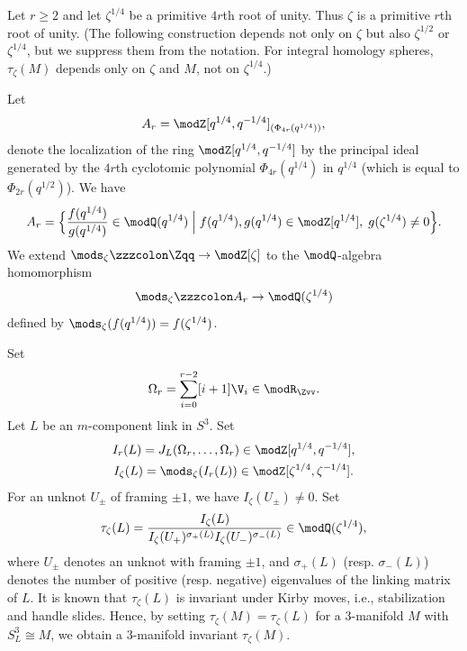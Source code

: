 \documentclass{amsart}
\numberwithin{equation}{section}
\numberwithin{figure}{section}
\theoremstyle{plain}
\theoremstyle{definition}
\theoremstyle{remark}
\begin{document}
Let $r\ge 2$ and let $\zeta ^{1/4}$ be a primitive $4r$th root of unity.
Thus $\zeta $ is a primitive $r$th root of unity.  (The following
construction depends not only on $\zeta $ but also $\zeta ^{1/2}$ or
$\zeta ^{1/4}$, but we suppress them from the notation.  For integral
homology spheres, $\tau _\zeta (M)$ depends only on $\zeta $ and $M$, not on
$\zeta ^{1/4}$.)

Let
\begin{equation*}
  A_r=\modZ [q^{1/4},q^{-1/4}]_{(\Phi _{4r}(q^{1/4}))},
\end{equation*}
denote the localization of the ring $\modZ [q^{1/4},q^{-1/4}]$ by the
principal ideal generated by the $4r$th cyclotomic polynomial
$\Phi _{4r}(q^{1/4})$ in $q^{1/4}$ (which is equal to
$\Phi _{2r}(q^{1/2})$).  We have
\begin{equation*}
  A_r=\Bigl\{\frac{f(q^{1/4})}{g(q^{1/4})}\in \modQ (q^{1/4})
    \;\Bigl|\;f(q^{1/4}),g(q^{1/4})\in \modZ [q^{1/4}],\; g(\zeta ^{1/4})\neq0 \Bigr\}.
\end{equation*}
We extend $\mods _\zeta \zzzcolon \Zqq\rightarrow \modZ [\zeta ]$ to the $\modQ $-algebra homomorphism
\begin{equation*}
  \mods _\zeta \zzzcolon A_r\rightarrow \modQ (\zeta ^{1/4})
\end{equation*}
defined by $\mods _\zeta (f(q^{1/4}))=f(\zeta ^{1/4})$.

Set
\begin{equation*}
  \Omega _r = \sum_{i=0}^{r-2}[i+1]\V_i\in \modR _{\Zvv}.
\end{equation*}
Let $L$ be an $m$-component link in $S^3$.  Set
\begin{gather*}
  I_r(L)=J_L(\Omega _r,\ldots,\Omega _r) \in \modZ [q^{1/4},q^{-1/4}],\\
  I_\zeta (L)=\mods _\zeta (I_r(L)) \in \modZ [\zeta ^{1/4},\zeta ^{-1/4}].
\end{gather*}
For an unknot $U_\pm $ of framing $\pm 1$, we have $I_\zeta (U_\pm )\neq0$.  Set
\begin{equation}
  \label{e43}
  \tau _\zeta (L)=
  \frac{I_\zeta (L)}{I_\zeta (U_+)^{\sigma _+(L)}I_\zeta (U_-)^{\sigma _-(L)}}
  \in \modQ (\zeta ^{1/4}),
\end{equation}
where $U_\pm $ denotes an unknot with framing $\pm 1$, and $\sigma _+(L)$
(resp. $\sigma _-(L)$) denotes the number of positive (resp. negative)
eigenvalues of the linking matrix of $L$.  It is known that $\tau _\zeta (L)$
is invariant under Kirby moves, i.e., stabilization and handle slides.
Hence, by setting $\tau _\zeta (M)=\tau _\zeta (L)$ for a $3$-manifold $M$ with
$S^3_L\cong M$, we obtain a $3$-manifold invariant $\tau _\zeta (M)$.
\end{document}
